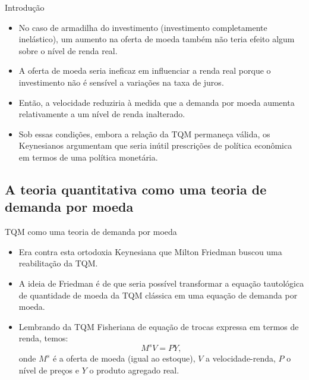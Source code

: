 \documentclass[10pt]{beamer}
\begin{document}
\begin{frame}{Introdução}
    \begin{itemize}
        \item No caso de armadilha do investimento (investimento completamente inelástico), um aumento na oferta de moeda também não teria efeito algum sobre o nível de renda real.
        \bigskip
        \item A oferta de moeda seria ineficaz em influenciar a renda real porque o investimento não é sensível a variações na taxa de juros.
        \bigskip
        \item Então, a velocidade reduziria à medida que a demanda por moeda aumenta relativamente a um nível de renda inalterado.
        \bigskip
        \item Sob essas condições, embora a relação da TQM permaneça válida, os Keynesianos argumentam que seria inútil prescrições de política econômica em termos de uma política monetária.
    \end{itemize}
\end{frame}

\subsection{A teoria quantitativa como uma teoria de demanda por moeda}
\begin{frame}{TQM como uma teoria de demanda por moeda}
    \begin{itemize}
        \item Era contra esta ortodoxia Keynesiana que Milton Friedman buscou uma reabilitação da TQM.
        \bigskip
        \item A ideia de Friedman é de que seria possível transformar a equação tautológica de quantidade de moeda da TQM clássica em uma equação de demanda por moeda.
        \bigskip
        \item Lembrando da TQM Fisheriana de equação de trocas expressa em termos de renda, temos:
        \[
        M^sV = PY,
        \]
        onde $M^s$ é a oferta de moeda (igual ao estoque), $V$ a velocidade-renda, $P$ o nível de preços e $Y$ o produto agregado real.
    \end{itemize}
\end{frame}
\end{document}
